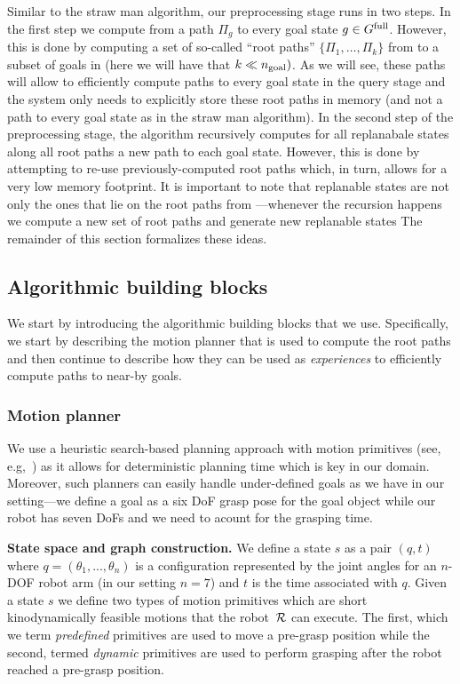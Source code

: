 \documentclass[conference]{IEEEtran}
\begin{document}
Similar to the straw man algorithm, our preprocessing stage runs in two steps.
In the first step we  compute from \Shome a path $\Pi_g$ to every goal state $ g \in G^{\textrm{full}}$. However, this is done by computing a set of so-called ``root paths'' $\{\Pi_1, \ldots, \Pi_k \}$ from \Shome to a subset of goals in \Gfull (here we will have that $k \ll n_{\rm goal})$. 
As we will see, these paths will allow to efficiently compute paths to every goal state in the query stage and the system only needs to explicitly store these root paths in memory (and not a path to every goal state as in the straw man algorithm).
%
In the second step of the preprocessing stage, the algorithm recursively computes for all replanabale states along all root paths a new path to each goal state. However, this is done by attempting to re-use previously-computed root paths which, in turn, allows for a very low memory footprint.
%
It is important to note that replanable states are not only the ones that lie on the root paths from \Shome---whenever the recursion happens we compute a new set of root paths and generate new replanable states
%
The remainder of this section formalizes these ideas.

\subsection{Algorithmic building blocks}
We start by introducing the algorithmic building blocks that we use.
Specifically, we start by describing the motion planner that is used to compute the root paths 
and then continue to describe how they can be used as \emph{experiences} to efficiently compute paths to near-by goals.
\subsubsection{Motion planner}
We use a heuristic search-based planning approach with motion primitives (see, e.g,~\cite{CCL10,CSCL11,LF09})
as it allows for deterministic planning time which is key in our domain.
Moreover, such planners can easily handle under-defined goals as we have in our setting---we define a goal as a six DoF grasp pose for the goal object while our robot has seven DoFs and we need to acount for the grasping time.

\textbf{State space and graph construction.}
We define a state $s$ as a pair $(q,t)$ where $q = (\theta_1, ..., \theta_n)$ is a configuration represented by the joint angles for an $n$-DOF robot arm (in our setting $n=7$) and $t$ is the time associated with $q$.
%
Given a state $s$ we define two types of motion primitives which are short kinodynamically feasible motions that the robot~$\mathcal{R}$ can execute. The first, which we term \emph{predefined} primitives are used to move a pre-grasp position while the second, termed \emph{dynamic} primitives are used to perform grasping after the robot reached a pre-grasp position.
%
\end{document}
